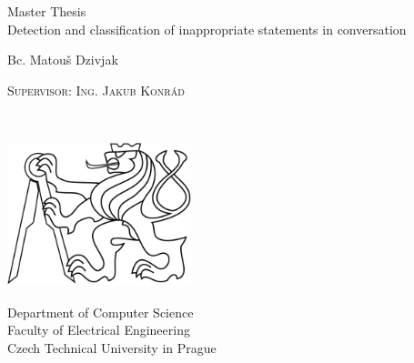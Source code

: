 \begin{titlepage}
\begingroup 
    \centering 
    \vspace*{\baselineskip} 
    \vspace{1cm}
    
    {\large Master Thesis} \\
    \vspace*{\baselineskip}
    {\LARGE Detection and classification of inappropriate statements in conversation}    
    \vspace*{5\baselineskip} 
    
    {\Large Bc. Matouš Dzivjak\par} 
    \scshape
    Supervisor: Ing. Jakub Konrád   

    \vspace*{1\baselineskip}
    \monthname \ \the\year
    
    \vfill
    
   \includegraphics[width=0.4\textwidth]{images/logo.pdf}

    
    \vspace*{1\baselineskip}
    Department of Computer Science\\
    Faculty of Electrical Engineering\\
    Czech Technical University in Prague\\[\baselineskip]
    
    \endgroup\cleardoublepage
\end{titlepage}
